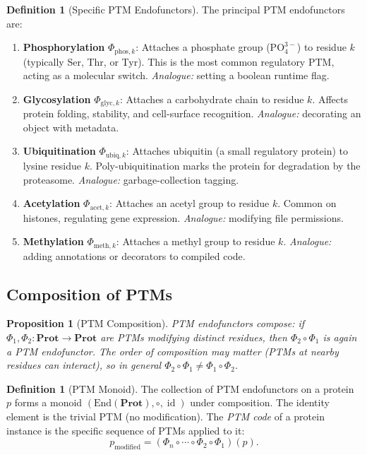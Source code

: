\documentclass[12pt,a4paper]{article}
\newtheorem{proposition}[theorem]{Proposition}
\theoremstyle{definition}
\newtheorem{definition}[theorem]{Definition}
\newcommand{\cat}[1]{\mathbf{#1}}
\newcommand{\id}{\operatorname{id}}
\begin{document}
\begin{definition}[Specific PTM Endofunctors]\label{def:ptm-types}
The principal PTM endofunctors are:
\begin{enumerate}[label=(\roman*)]
  \item \textbf{Phosphorylation} $\Phi_{\mathrm{phos},k}$: Attaches a phosphate group ($\mathrm{PO}_4^{3-}$) to residue $k$ (typically Ser, Thr, or Tyr). This is the most common regulatory PTM, acting as a molecular switch. \emph{Analogue:} setting a boolean runtime flag.

  \item \textbf{Glycosylation} $\Phi_{\mathrm{glyc},k}$: Attaches a carbohydrate chain to residue $k$. Affects protein folding, stability, and cell-surface recognition. \emph{Analogue:} decorating an object with metadata.

  \item \textbf{Ubiquitination} $\Phi_{\mathrm{ubiq},k}$: Attaches ubiquitin (a small regulatory protein) to lysine residue $k$. Poly-ubiquitination marks the protein for degradation by the proteasome. \emph{Analogue:} garbage-collection tagging.

  \item \textbf{Acetylation} $\Phi_{\mathrm{acet},k}$: Attaches an acetyl group to residue $k$. Common on histones, regulating gene expression. \emph{Analogue:} modifying file permissions.

  \item \textbf{Methylation} $\Phi_{\mathrm{meth},k}$: Attaches a methyl group to residue $k$. \emph{Analogue:} adding annotations or decorators to compiled code.
\end{enumerate}
\end{definition}

\subsection{Composition of PTMs}

\begin{proposition}[PTM Composition]\label{prop:ptm-composition}
PTM endofunctors compose: if $\Phi_1, \Phi_2 \colon \cat{Prot} \to \cat{Prot}$ are PTMs modifying distinct residues, then $\Phi_2 \circ \Phi_1$ is again a PTM endofunctor. The order of composition may matter (PTMs at nearby residues can interact), so in general $\Phi_2 \circ \Phi_1 \neq \Phi_1 \circ \Phi_2$.
\end{proposition}

\begin{definition}[PTM Monoid]\label{def:ptm-monoid}
The collection of PTM endofunctors on a protein $p$ forms a monoid $(\mathrm{End}(\cat{Prot}), \circ, \id)$ under composition. The identity element is the trivial PTM (no modification). The \emph{PTM code} of a protein instance is the specific sequence of PTMs applied to it:
\[
  p_{\text{modified}} = (\Phi_n \circ \cdots \circ \Phi_2 \circ \Phi_1)(p).
\]
\end{definition}
\end{document}
